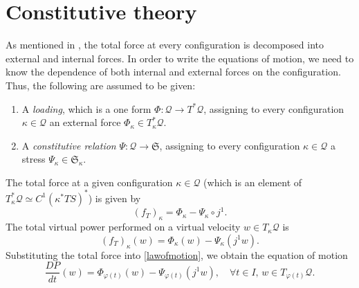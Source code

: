 \documentclass[smallextended]{svjour3}
\begin{document}
\section{Constitutive theory}
\label{sc13}

As  mentioned in , the total force at every configuration is decomposed into external and internal forces. In order to write the  equations of motion, we need to know the dependence of both internal and external forces on the configuration. 
Thus, the following are assumed to be given:
\begin{enumerate}
\item  A \emph{loading}, which is a one form  $\Phi:{\mathcal{Q}}\to T^*{\mathcal{Q}}$, assigning to every configuration $\kappa\in{\mathcal{Q}}$ an external force $\Phi_\kappa\in T_\kappa^*{\mathcal{Q}}$. 
\item A \emph{constitutive relation} $\Psi:{\mathcal{Q}}\to \mathfrak{S}$, assigning to every configuration $\kappa\in{\mathcal{Q}}$ a stress $\Psi_\kappa\in\mathfrak{S}_\kappa$. 
\end{enumerate}

The total force at a given configuration $\kappa\in{\mathcal{Q}}$ (which is an element of $T^*_\kappa{\mathcal{Q}}\simeq C^1({\kappa^*TS})^*$) is  given by 
\[
(f_T)_{\kappa}=\Phi_\kappa-\Psi_\kappa\circ j^1.
\]
The total virtual power performed on a virtual velocity $w\in T_\kappa{\mathcal{Q}}$ is 
\[
(f_T)_{\kappa}(w)=\Phi_\kappa(w) - \Psi_\kappa(j^1w).
\]
Substituting the total force into \eqref{lawofmotion}, we obtain the equation of motion
\begin{equation}\label{dynamiceq}
\frac{DP}{dt}(w)=\Phi_{{\varphi}(t)}(w)-\Psi_{{\varphi}(t)}(j^1w),\quad \forall t\in I,\, w\in T_{{\varphi}(t)}{\mathcal{Q}} .
\end{equation}
\end{document}
